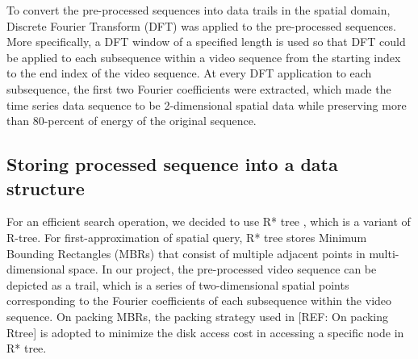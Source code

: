 To convert the pre-processed sequences into data trails in the spatial domain, Discrete Fourier Transform (DFT) was applied to the pre-processed sequences. More specifically, a  DFT window of a specified length is used so that DFT could be applied to each subsequence within a video sequence from the starting index to the end index of the video sequence. At every DFT application to each subsequence, the first two Fourier coefficients were extracted, which made the time series data sequence to be 2-dimensional spatial data while preserving more than 80-percent of energy of the original sequence.

\subsection{Storing processed sequence into a data structure} 
For an efficient search operation, we decided to use R* tree \cite{Faloutsos:1994}\cite{Kamel:1993}, which is a variant of R-tree. For first-approximation of spatial query, R* tree stores Minimum Bounding Rectangles (MBRs) that consist of multiple adjacent points in multi-dimensional space. In our project, the pre-processed video sequence can be depicted as a trail, which is a series of two-dimensional spatial points corresponding to the Fourier coefficients of each subsequence within the video sequence. On packing MBRs, the packing strategy used in [REF: On packing Rtree] is adopted to minimize the disk access cost in accessing a specific node in R* tree.